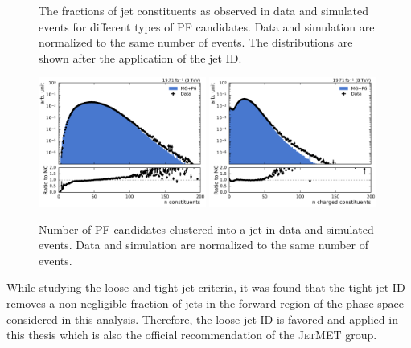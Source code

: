 \begin{figure}[htbp]
    \caption[PF candidate fractions in jets]{The fractions of jet constituents as
            observed in data and simulated events for different types of PF candidates.
            Data and simulation are normalized to the same number of events. The
            distributions are shown after the application of the jet ID.}
    \label{fig:jet_constituents_fractions}
\end{figure}

\begin{figure}[htbp]
    \centering
    \includegraphics[width=0.49\textwidth]{figures/measurement/jet_constituent_nConstituents.pdf}\hfill
    \includegraphics[width=0.49\textwidth]{figures/measurement/jet_constituent_nCharged.pdf}
    \caption[Number of particle candidates in jets]{Number of PF candidates
             clustered into a jet in data and simulated events. Data and simulation are
             normalized to the same number of events.}
    \label{fig:jet_constituents_counts}
\end{figure}

While studying the loose and tight jet criteria, it was found that the tight jet
ID removes a non-negligible fraction of jets in the forward region of the
phase space considered in this analysis. Therefore, the loose jet ID is favored
and applied in this thesis which is also the official recommendation of the
\textsc{JetMET} group.

